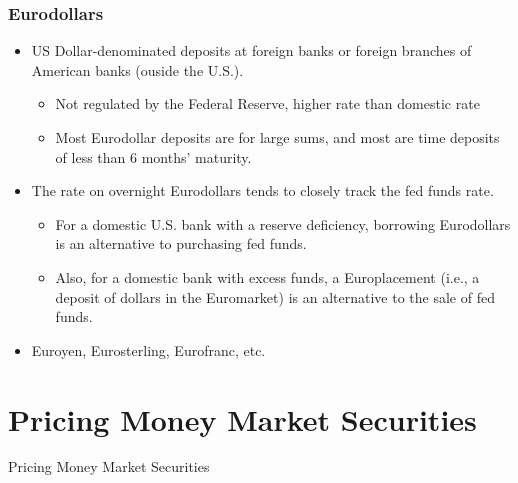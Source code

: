 \documentclass[10pt]{beamer}
\begin{document}
	\begin{frame}
		\frametitle{Eurodollars}
		
		\begin{itemize}
			\item US Dollar-denominated deposits at foreign banks or foreign branches of American banks (ouside the U.S.). 		
			\begin{itemize}
				\item Not regulated by the Federal Reserve, higher rate than domestic rate
				\item Most Eurodollar deposits are for large sums, and most are time deposits of less than 6 months' maturity.
			\end{itemize}		
			
			\item The rate on overnight Eurodollars tends to closely track the fed funds rate. 
			\begin{itemize}
				\item For a domestic U.S. bank with a reserve deficiency, borrowing Eurodollars is an alternative to purchasing fed funds.
				\item Also, for a domestic bank with excess funds, a Europlacement (i.e., a deposit of dollars in the Euromarket) is an alternative to the sale of fed funds.
			\end{itemize}
			\item Euroyen, Eurosterling, Eurofranc, etc.
		\end{itemize}		
		
	\end{frame}
	
	
	
	
	
	\section{Pricing Money Market Securities}
	\begin{frame}
		\begin{center}
			{\Large Pricing Money Market Securities}
		\end{center}
	\end{frame}
	
	
	
\end{document}
